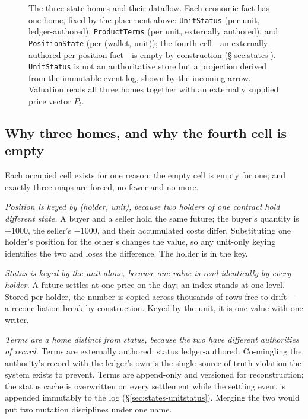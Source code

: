 \documentclass[11pt,a4paper]{article}
\begin{document}
\begin{figure}[tb]
\caption{The three state homes and their dataflow. Each economic fact has one home, fixed by
the placement above: \texttt{UnitStatus} (per unit, ledger-authored), \texttt{ProductTerms}
(per unit, externally authored), and \texttt{PositionState} (per (wallet, unit)); the fourth
cell---an externally authored per-position fact---is empty by construction (\S\ref{sec:states}).
\texttt{UnitStatus} is not an authoritative store but a projection derived from the immutable
event log, shown by the incoming arrow. Valuation reads all three homes together with an
externally supplied price vector $P_t$.}
\label{fig:threehome}
\end{figure}


\subsection{Why three homes, and why the fourth cell is empty}
\label{sec:states-three}

Each occupied cell exists for one reason; the empty cell is empty for one; and exactly
three maps are forced, no fewer and no more.

\emph{Position is keyed by (holder, unit), because two holders of one contract hold
different state.} A buyer and a seller hold the same future; the buyer's quantity is
$+1000$, the seller's $-1000$, and their accumulated costs differ. Substituting one
holder's position for the other's changes the value, so any unit-only keying identifies the
two and loses the difference. The holder is in the key.

\emph{Status is keyed by the unit alone, because one value is read identically by every
holder.} A future settles at one price on the day; an index stands at one level. Stored
per holder, the number is copied across thousands of rows free to drift --- a
reconciliation break by construction. Keyed by the unit, it is one value with one writer.

\emph{Terms are a home distinct from status, because the two have different authorities of
record.} Terms are externally authored, status ledger-authored. Co-mingling the
authority's record with the ledger's own is the single-source-of-truth violation the
system exists to prevent. Terms are append-only and versioned for reconstruction; the
status cache is overwritten on every settlement while the settling event is appended
immutably to the log (\S\ref{sec:states-unitstatus}). Merging the two would put two
mutation disciplines under one name.
\end{document}

